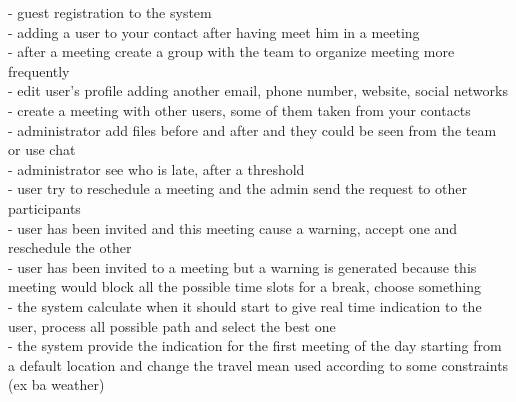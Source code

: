 - guest registration  to the system \\
- adding a user to your contact after having meet him in a meeting \\
- after a meeting create a group with the team to organize meeting more frequently \\
- edit user's profile adding another email, phone number, website, social networks \\
- create a meeting with other users, some of them taken from your contacts\\
- administrator add files before and after and they could be seen from the team or use chat\\
- administrator see who is late, after a threshold\\
- user try to reschedule a meeting and the admin send the request to other participants\\
- user has been invited and this meeting cause a warning, accept one and reschedule the other\\
- user has been invited to a meeting but a warning is generated because this meeting would block all the possible time slots for a break, choose something\\
- the system calculate when it should start to give real time indication to the user, process all possible path and select the best one\\
- the system provide the indication for the first meeting of the day starting from a default location and change the travel mean used according to some constraints (ex ba weather)\\